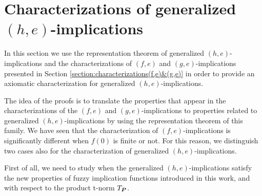 \section{Characterizations of generalized $(h,e)$-implications}\label{section:characterization(h,e)}

In this section we use the representation theorem of generalized $(h,e)$-implications and the characterizations of $(f,e)$ and $(g,e)$-implications presented in Section \ref{section:characterizations(f,e)&(g,e)} in order to provide an axiomatic characterization for generalized $(h,e)$-implications.

The idea of the proofs is to translate the properties that appear in the characterizations of the $(f,e)$ and $(g,e)$-implications to properties related to generalized $(h,e)$-implications by using the representation theorem of this family. We have seen that the characterization of $(f,e)$-implications is significantly different when $f(0)$ is finite or not. For this reason, we distinguish two cases also for the characterization of generalized $(h,e)$-implications.

First of all, we need to study when the generalized $(h,e)$-implications satisfy the new properties of fuzzy implication functions introduced in this work, \LIex and \LIey with respect to the product t-norm $T_{\bm{P}}$.

